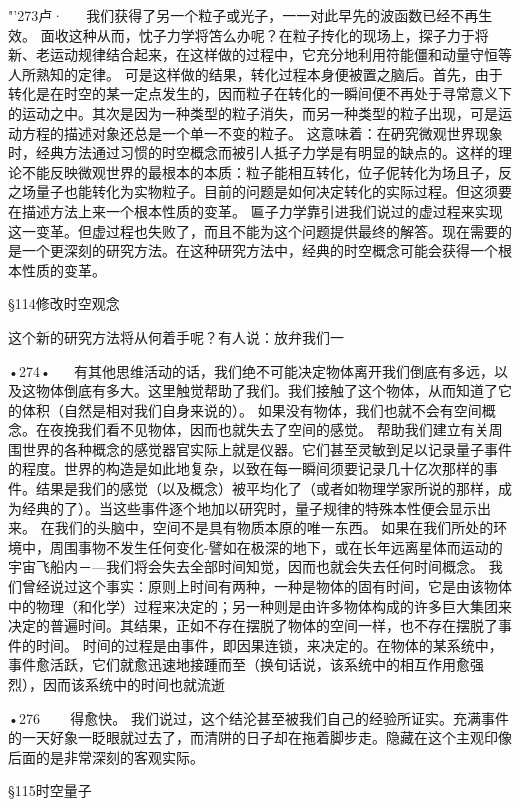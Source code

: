"'273卢·
  
我们获得了另一个粒子或光子，一一对此早先的波函数已经不再生效。
面收这种从而，忱子力学将笘么办呢？在粒子抟化的现场上，探子力于将新、老运动规律结合起来，在这样做的过程中，它充分地利用符能僵和动量守恒等人所熟知的定律。
可是这样做的结果，转化过程本身便被置之脑后。首先，由于转化是在时空的某一定点发生的，因而粒子在转化的一瞬间便不再处于寻常意义下的运动之中。其次是因为一种类型的粒子消失，而另一种类型的粒子出现，可是运动方程的描述对象还总是一个单一不变的粒子。
这意味着：在砃究微观世界现象时，经典方法通过习惯的时空概念而被引人抵子力学是有明显的缺点的。这样的理论不能反映微观世界的最根本的本质：粒子能相互转化，位子伲转化为场且子，反之场量子也能转化为实物粒子。目前的问题是如何决定转化的实际过程。但这须要在描述方法上来一个根本性质的变革。
匾子力学靠引进我们说过的虚过程来实现这一变革。但虚过程也失败了，而且不能为这个问题提供最终的解答。现在需要的是一个更深刻的研究方法。在这种研究方法中，经典的时空概念可能会获得一个根本性质的变革。

§114修改时空观念

这个新的研究方法将从何着手呢？有人说：放弁我们一

•274•
 
有其他思维活动的话，我们绝不可能决定物体离开我们倒底有多远，以及这物体倒底有多大。这里触觉帮助了我们。我们接触了这个物体，从而知道了它的体积（自然是相对我们自身来说的）。
如果没有物体，我们也就不会有空间概念。在夜挽我们看不见物体，因而也就失去了空间的感觉。
帮助我们建立有关周围世界的各种概念的感觉器官实际上就是仪器。它们甚至灵敏到足以记录量子事件的程度。世界的构造是如此地复杂，以致在每一瞬间须要记录几十亿次那样的事件。结果是我们的感觉（以及概念）被平均化了（或者如物理学家所说的那样，成为经典的了）。当这些事件逐个地加以研究时，量子规律的特殊本性便会显示出来。
在我们的头脑中，空间不是具有物质本原的唯一东西。
如果在我们所处的环境中，周围事物不发生任何变化-譬如在极深的地下，或在长年远离星体而运动的宇宙飞船内－—我们将会失去全部时间知觉，因而也就会失去任何时间概念。
我们曾经说过这个事实：原则上时间有两种，一种是物体的固有时间，它是由该物体中的物理（和化学）过程来决定的；另一种则是由许多物体构成的许多巨大集团来决定的普遍时间。其结果，正如不存在摆脱了物体的空间一样，也不存在摆脱了事件的时间。
时间的过程是由事件，即因果连锁，来决定的。在物体的某系统中，事件愈活跃，它们就愈迅速地接踵而至（换旬话说，该系统中的相互作用愈强烈），因而该系统中的时间也就流逝

•276~
  
得愈快。
我们说过，这个结沦甚至被我们自己的经验所证实。充满事件的一天好象一眨眼就过去了，而清阱的日子却在拖着脚步走。隐藏在这个主观印像后面的是非常深刻的客观实际。

§115时空量子

